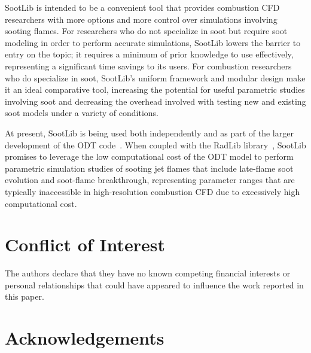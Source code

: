 \documentclass[preprint,letterpaper]{elsarticle}
\begin{document}
SootLib is intended to be a convenient tool that provides combustion CFD researchers with more options and more control over simulations involving sooting flames. For researchers who do not specialize in soot but require soot modeling in order to perform accurate simulations, SootLib lowers the barrier to entry on the topic; it requires a minimum of prior knowledge to use effectively, representing a significant time savings to its users. For combustion researchers who do specialize in soot, SootLib's uniform framework and modular design make it an ideal comparative tool, increasing the potential for useful parametric studies involving soot and decreasing the overhead involved with testing new and existing soot models under a variety of conditions.

At present, SootLib is being used both independently and as part of the larger development of the ODT code~\cite{Stephens_2021}. When coupled with the RadLib library~\cite{Stephens_2022}, SootLib promises to leverage the low computational cost of the ODT model to perform parametric simulation studies of sooting jet flames that include late-flame soot evolution and soot-flame breakthrough, representing parameter ranges that are typically inaccessible in high-resolution combustion CFD due to excessively high computational cost.



\section{Conflict of Interest}


The authors declare that they have no known competing financial interests or personal relationships that could have appeared to influence the work reported in this paper.


\section*{Acknowledgements}
\end{document}
